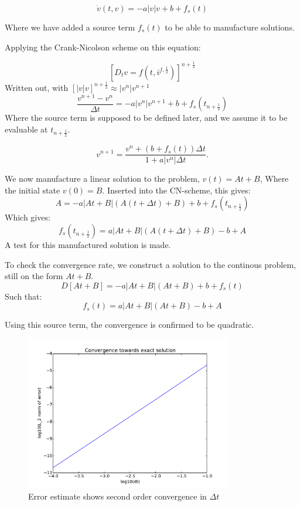 \documentclass[a4paper, 10pt]{article}
\begin{document}
\begin{equation}
	\dot{v}(t, v) = -a|v|v + b + f_s(t)
\end{equation}

Where we have added a source term $f_s(t)$ to be able to manufacture solutions.

Applying the Crank-Nicolson scheme on this equation:

\begin{equation}
	\left[ D_t v = f(t, \bar{v}^{t, \frac{1}{2}})\right]^{n+\frac{1}{2}}
\end{equation}
Written out, with $[|v|v]^{n+\frac{1}{2}} \approx |v^{n}|v^{n+1}$
\begin{equation}
	\frac{v^{n+1}-v^{n}}{\Delta t} = -a |v^{n}| v^{n+1} + b + f_s(t_{n+\frac{1}{2}})
\end{equation}
Where the source term is supposed to be defined later, and we assume it to be evaluable at $t_{n+\frac{1}{2}}$.

\begin{equation}
	v^{n+1} = \frac{v^n + (b + f_s(t))\Delta t }{1 + a |v^n| \Delta t}.
\end{equation}

We now manufacture a linear solution to the problem, $v(t) = At+B$, Where the initial state $v(0) = B$. Inserted into the CN-scheme, this gives:
\begin{equation}
	A = -a|At+B|(A(t+\Delta t) + B) + b+ f_s(t_{n+\frac{1}{2}})
\end{equation}
Which gives:
\begin{equation}
	f_s(t_{n+\frac{1}{2}}) = a|At+B|(A(t+\Delta t) + B) - b + A
\end{equation}
A test for this manufactured solution is made.

To check the convergence rate, we construct a solution to the continous problem, still on the form $At+ B$.
\begin{equation}
	D[At+B] = -a|At+B|(At+B) + b + f_s(t)
\end{equation}
Such that:
\begin{equation}
	f_s(t) = a|At+B|(At+B) - b + A
\end{equation}

Using this source term, the convergence is confirmed to be quadratic.
\begin{figure}
\centering
	\includegraphics[width=0.8\textwidth]{figures/convergence.pdf}
	\caption{Error estimate shows second order convergence in $\Delta t$}
\end{figure}
\end{document}

